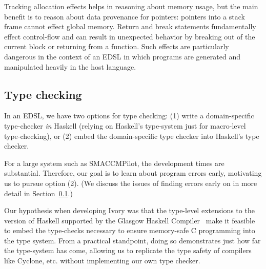 \noindent
Tracking allocation effects helps in reasoning about memory usage, but the main
benefit is to reason about data provenance for pointers: pointers into a stack
frame cannot effect global memory.  Return and break statements fundamentally
effect control-flow and can result in unexpected behavior by breaking out of the
current block or returning from a function.  Such effects are particularly
dangerous in the context of an EDSL in which programs are generated and
manipulated heavily in the host language.

\subsection{Type checking}
In an EDSL, we have two options for type checking: (1) write a domain-specific
type-checker \emph{in} Haskell (relying on Haskell's type-system just for
macro-level type-checking), or (2) embed the domain-specific type checker into
Haskell's type checker.

For a large system such as SMACCMPilot, the development times are substantial.
Therefore, our goal is to learn about program errors early, motivating us to
pursue option (2).  (We discuss the issues of finding errors early on in more
detail in Section~\ref{}.)

Our hypothesis when developing Ivory was that the type-level extensions to the
version of Haskell supported by the Glasgow Haskell Compiler~\cite{}  make it feasible to embed the type-checks
necessary to ensure memory-safe C programming into the type system.  From a
practical standpoint, doing so demonstrates just how far the type-system has
come, allowing us to replicate the type safety of compilers like Cyclone,
etc. without implementing our own type checker.

